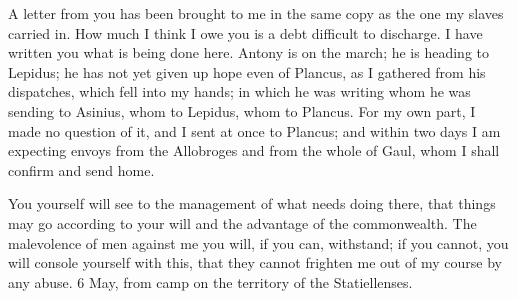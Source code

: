 

 A letter from you has been brought to me in the same copy as the one my slaves carried in. How much I think I owe you is a debt difficult to discharge. I have written you what is being done here. Antony is on the march; he is heading to Lepidus; he has not yet given up hope even of Plancus, as I gathered from his dispatches, which fell into my hands; in which he was writing whom he was sending to Asinius, whom to Lepidus, whom to Plancus. For my own part, I made no question of it, and I sent at once to Plancus; and within two days I am expecting envoys from the Allobroges and from the whole of Gaul, whom I shall confirm and send home.

 You yourself will see to the management of what needs doing there, that things may go according to your will and the advantage of the commonwealth. The malevolence of men against me you will, if you can, withstand; if you cannot, you will console yourself with this, that they cannot frighten me out of my course by any abuse. 6 May, from camp on the territory of the Statiellenses.

